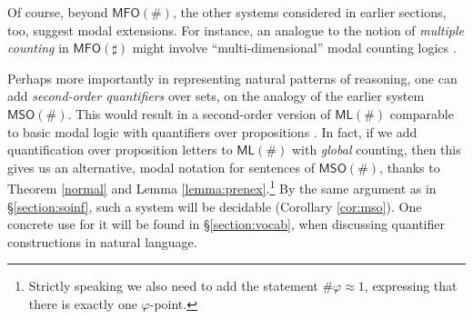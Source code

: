 \documentclass[12pt,oneside,reqno]{amsart}
\theoremstyle{definition}
\begin{document}





Of course, beyond $\mathsf{MFO}(\#)$, the other systems considered in  earlier sections, too,  suggest modal extensions. For instance, an  analogue to the notion of \emph{multiple counting} in $\mathsf{MFO}(\sharp)$ might involve ``multi-dimensional'' modal counting logics \citep{MarxVenema}.  

Perhaps more importantly in representing natural patterns of reasoning,  one can add \emph{second-order quantifiers} over sets, on the analogy of the earlier system  $\mathsf{MSO}(\#)$. This would  result in   a second-order version of  $\mathsf{ML}(\#)$ comparable to basic modal logic with quantifiers over propositions \citep{Fine1970}. In fact, if we add quantification over proposition letters to $\mathsf{ML}(\#)$ with \emph{global} counting, then this gives us an alternative, modal notation for sentences of $\mathsf{MSO}(\#)$, thanks to Theorem \ref{normal} and Lemma \ref{lemma:prenex}.\footnote{Strictly speaking we also need to add the statement $\#\varphi \approx 1$, expressing that there is exactly one $\varphi$-point.} By the same argument as in \S\ref{section:soinf}, such a system will be decidable (Corollary \ref{cor:mso}). One concrete use for it will be found in \S\ref{section:vocab}, when discussing quantifier constructions in natural language. 
\end{document}
